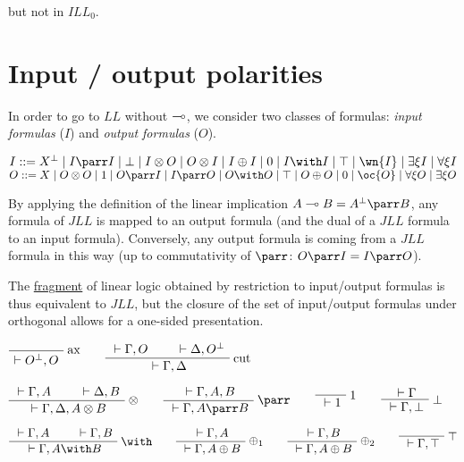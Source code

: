 but not in \(ILL_0\).

\section{Input / output polarities}\label{input-output-polarities}

In order to go to \(LL\) without \(\multimap\), we consider two classes of
formulas: \emph{input formulas} (\(I\)) and \emph{output formulas}
(\(O\)).

\(I ::= X\orth \mid I\parr I \mid \bot \mid I\tens O \mid O\tens I \mid I\plus I \mid \zero \mid I\with I \mid \top \mid \wn{I} \mid \exists\xi I \mid \forall\xi I\)
\(O ::= X \mid O\tens O \mid \one \mid O\parr I \mid I\parr O \mid O\with O \mid \top \mid O\plus O \mid \zero \mid \oc{O} \mid \forall\xi O \mid \exists\xi O\)

By applying the definition of the linear implication
\(A\limp B = A\orth\parr B\), any formula of \(JLL\) is mapped to an
output formula (and the dual of a \(JLL\) formula to an input formula).
Conversely, any output formula is coming from a \(JLL\) formula in this
way (up to commutativity of \(\parr\): \(O\parr I = I\parr O\)).

The \url{fragment} of linear logic obtained by restriction to
input/output formulas is thus equivalent to \(JLL\), but the closure of
the set of input/output formulas under orthogonal allows for a one-sided
presentation.

\(\LabelRule{\rulename{ax}}
\NulRule{\vdash O\orth,O}
\DisplayProof
\qquad
\AxRule{{}\vdash \Gamma,O}
\AxRule{{}\vdash\Delta,O\orth}
\LabelRule{\rulename{cut}}
\BinRule{{}\vdash\Gamma,\Delta}
\DisplayProof\)

\(\AxRule{{}\vdash\Gamma,A}
\AxRule{{}\vdash\Delta,B}
\LabelRule{\tens}
\BinRule{{}\vdash\Gamma,\Delta,A\tens B}
\DisplayProof
\qquad
\AxRule{{}\vdash\Gamma,A,B}
\LabelRule{\parr}
\UnaRule{{}\vdash\Gamma,A\parr B}
\DisplayProof
\qquad
\LabelRule{\one}
\NulRule{{}\vdash\one}
\DisplayProof
\qquad
\AxRule{{}\vdash\Gamma}
\LabelRule{\bot}
\UnaRule{{}\vdash\Gamma,\bot}
\DisplayProof\)

\(\AxRule{{}\vdash\Gamma,A}
\AxRule{{}\vdash\Gamma,B}
\LabelRule{\with}
\BinRule{{}\vdash\Gamma,A\with B}
\DisplayProof
\qquad
\AxRule{{}\vdash\Gamma,A}
\LabelRule{\plus_1}
\UnaRule{{}\vdash\Gamma,A\plus B}
\DisplayProof
\qquad
\AxRule{{}\vdash\Gamma,B}
\LabelRule{\plus_2}
\UnaRule{{}\vdash\Gamma,A\plus B}
\DisplayProof
\qquad
\LabelRule{\top}
\NulRule{{}\vdash\Gamma,\top}
\DisplayProof\)

